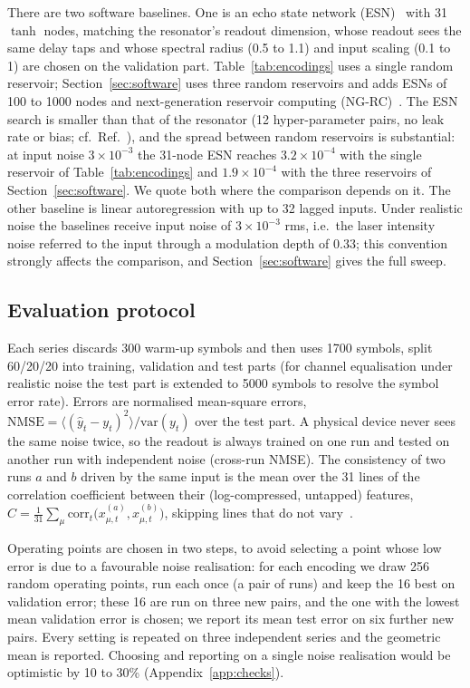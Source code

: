 There are two software baselines. One is an echo state network (ESN)~\cite{jaeger2001} with 31 $\tanh$ nodes, matching the
resonator's readout dimension, whose readout sees the same delay taps and whose spectral radius (0.5 to 1.1) and input scaling
(0.1 to 1) are chosen on the validation part. Table~\ref{tab:encodings} uses a single random reservoir; Section~\ref{sec:software}
uses three random reservoirs and adds ESNs of 100 to 1000 nodes and next-generation reservoir computing
(NG-RC)~\cite{gauthier2021}. The ESN search is smaller than that of the resonator (12 hyper-parameter pairs, no leak rate or bias;
cf.\ Ref.~\cite{lukosevicius2012}), and the spread between random reservoirs is substantial: at input noise $3\times10^{-3}$ the
31-node ESN reaches $3.2\times10^{-4}$ with the single reservoir of Table~\ref{tab:encodings} and $1.9\times10^{-4}$ with the
three reservoirs of Section~\ref{sec:software}. We quote both where the comparison depends on it. The other baseline is linear
autoregression with up to 32 lagged inputs.
Under realistic noise the baselines receive input noise of $3\times10^{-3}$ rms, i.e.\ the laser intensity noise referred to the
input through a modulation depth of $0.33$; this convention strongly affects the comparison, and Section~\ref{sec:software} gives
the full sweep.

\subsection{Evaluation protocol}\label{sec:protocol}

Each series discards 300 warm-up symbols and then uses 1700 symbols, split 60/20/20 into training, validation and test parts (for
channel equalisation under realistic noise the test part is extended to 5000 symbols to resolve the symbol error rate).
Errors are normalised mean-square errors, $\mathrm{NMSE}=\langle(\hat y_t-y_t)^2\rangle/\mathrm{var}(y_t)$ over the test part.
A physical device never sees the same noise twice, so the readout is always trained on one run and tested on another run with
independent noise (cross-run NMSE). The consistency of two runs $a$ and $b$ driven by the same input is the mean over the 31 lines of
the correlation coefficient between their (log-compressed, untapped) features, $C=\frac{1}{31}\sum_\mu
\mathrm{corr}_t\big(x^{(a)}_{\mu,t},x^{(b)}_{\mu,t}\big)$, skipping lines that do not vary~\cite{uchida2004}.

Operating points are chosen in two steps, to avoid selecting a point whose low error is due to a favourable noise realisation: for each encoding we draw 256
random operating points, run each once (a pair of runs) and keep the 16 best on validation error; these 16 are run on three new
pairs, and the one with the lowest mean validation error is chosen; we report its mean test error on six further new pairs.
Every setting is repeated on three independent series and the geometric mean is reported.
Choosing and reporting on a single noise realisation would be optimistic by 10 to 30\% (Appendix~\ref{app:checks}).
